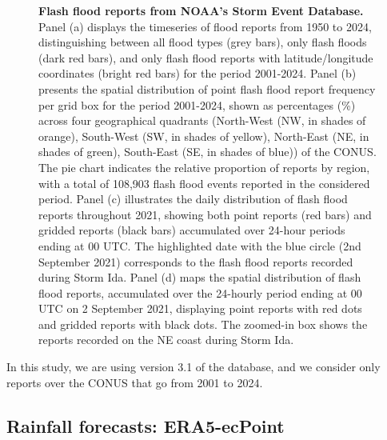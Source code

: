 \begin{figure}[htbp]
\caption{\textbf{Flash flood reports from NOAA's Storm Event Database.} Panel (a) displays the timeseries of flood reports from 1950 to 2024, distinguishing between all flood types (grey bars), only flash floods (dark red bars), and only flash flood reports with latitude/longitude coordinates (bright red bars) for the period 2001-2024. Panel (b) presents the spatial distribution of point flash flood report frequency per grid box for the period 2001-2024, shown as percentages (\%) across four geographical quadrants (North-West (NW, in shades of orange), South-West (SW, in shades of yellow), North-East (NE, in shades of green), South-East (SE, in shades of blue)) of the CONUS. The pie chart indicates the relative proportion of reports by region, with a total of 108,903 flash flood events reported in the considered period. Panel (c) illustrates the daily distribution of flash flood reports throughout 2021, showing both point reports (red bars) and gridded reports (black bars) accumulated over 24-hour periods ending at 00 UTC. The highlighted date with the blue circle (2nd September 2021) corresponds to the flash flood reports recorded during Storm Ida. Panel (d) maps the spatial distribution of flash flood reports, accumulated over the 24-hourly period ending at 00 UTC on 2 September 2021, displaying point reports with red dots and gridded reports with black dots. The zoomed-in box shows the reports recorded on the NE coast during Storm Ida.}
\label{fig:sed_ff_reports}
\end{figure}

In this study, we are using version 3.1 of the database, and we consider only reports over the CONUS that go from 2001 to 2024. 

\subsection{Rainfall forecasts: ERA5-ecPoint}
\label{flash_flood_focused_verification_rainfall_based_ff_DATA_ERA5_ecPoint}

